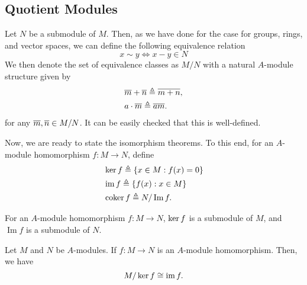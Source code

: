 \subsection{Quotient Modules}
Let $N$ be a submodule of $M$. Then, as we have done for the case for groups, rings, and vector spaces, we can define the following equivalence relation
\[x \sim y \iff x-y \in N\]
We then denote the set of equivalence classes as $M/N$ with a natural $A$-module structure given by 
\[
\begin{aligned}
    &\overline{m}+\overline{n}\triangleq\overline{m+n},\\
    &a \cdot \overline{m}\triangleq\overline{a m}.
\end{aligned}
\]
for any $\overline{m}, \overline{n} \in M/N$. It can be easily checked that this is well-defined.

Now, we are ready to state the isomorphism theorems. To this end, for an $A$-module homomorphism $f: M \rightarrow N$, define
\[
\begin{aligned}
    &\operatorname{\text{ker\/}}{f}\triangleq\{x \in M: f(x)=0\}\\
    &\operatorname{\text{im\/}}{f}\triangleq\{f(x): x \in M\}\\
    &\operatorname{\text{coker\/}}{f}\triangleq N / \operatorname{Im} f.
\end{aligned}
\]
\begin{remark}
    For an $A$-module homomorphism $f: M \rightarrow N$, $\operatorname{\text{ker\/}}{f}$ is a submodule of $M$, and $\operatorname{Im} f$ is a submodule of $N$.
\end{remark}
\begin{theorem}\label{thm: first-iso-module}
    Let $M$ and $N$ be $A$-modules. If $f: M \rightarrow N$ is an $A$-module homomorphism. Then, we have
    \[ M / \operatorname{\text{ker\/}}{f} \cong \operatorname{\text{im\/}}{f} .\]
\end{theorem}
